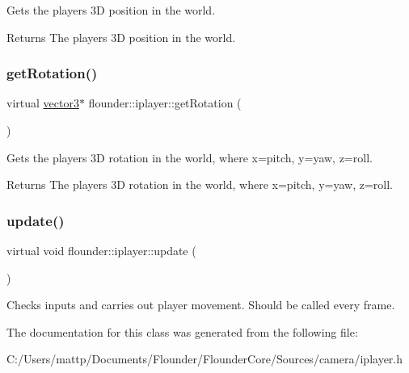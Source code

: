 Gets the players 3D position in the world. 

\begin{DoxyReturn}{Returns}
The players 3D position in the world. 
\end{DoxyReturn}
\mbox{\label{classflounder_1_1iplayer_a3f69953d51bc8c697060a3ec52a0fe79}} 
\subsubsection{\texorpdfstring{get\+Rotation()}{getRotation()}}
{\footnotesize\ttfamily virtual \hyperlink{classflounder_1_1vector3}{vector3}$\ast$ flounder\+::iplayer\+::get\+Rotation (\begin{DoxyParamCaption}{ }\end{DoxyParamCaption})\hspace{0.3cm}{\ttfamily [pure virtual]}}



Gets the players 3D rotation in the world, where x=pitch, y=yaw, z=roll. 

\begin{DoxyReturn}{Returns}
The players 3D rotation in the world, where x=pitch, y=yaw, z=roll. 
\end{DoxyReturn}
\mbox{\label{classflounder_1_1iplayer_a763358c47f9d9433b0ce467418492038}} 
\subsubsection{\texorpdfstring{update()}{update()}}
{\footnotesize\ttfamily virtual void flounder\+::iplayer\+::update (\begin{DoxyParamCaption}{ }\end{DoxyParamCaption})\hspace{0.3cm}{\ttfamily [pure virtual]}}



Checks inputs and carries out player movement. Should be called every frame. 



The documentation for this class was generated from the following file\+:\begin{DoxyCompactItemize}
\item 
C\+:/\+Users/mattp/\+Documents/\+Flounder/\+Flounder\+Core/\+Sources/camera/iplayer.\+h\end{DoxyCompactItemize}
